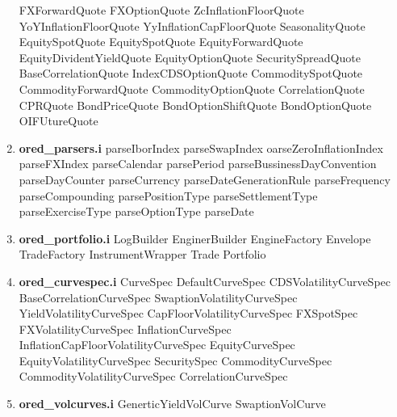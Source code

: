 \documentclass[10pt]{article}
\begin{document}
\begin{multicols}{2}
\begin{enumerate}
                \subitem FXForwardQuote
                \subitem FXOptionQuote
                \subitem ZcInflationFloorQuote
                \subitem YoYInflationFloorQuote
                \subitem YyInflationCapFloorQuote
                \subitem SeasonalityQuote
                \subitem EquitySpotQuote
                \subitem EquitySpotQuote
                \subitem EquityForwardQuote
                \subitem EquityDividentYieldQuote
                \subitem EquityOptionQuote
                \subitem SecuritySpreadQuote
                \subitem BaseCorrelationQuote
                \subitem IndexCDSOptionQuote
                \subitem CommoditySpotQuote
                \subitem CommodityForwardQuote
                \subitem CommodityOptionQuote
                \subitem CorrelationQuote
                \subitem CPRQuote
                \subitem BondPriceQuote
                \subitem BondOptionShiftQuote
                \subitem BondOptionQuote
                \subitem OIFUtureQuote
            \item \textbf{ored\_parsers.i}
                \subitem parseIborIndex
                \subitem parseSwapIndex
                \subitem oarseZeroInflationIndex
                \subitem parseFXIndex
                \subitem parseCalendar
                \subitem parsePeriod
                \subitem parseBussinessDayConvention
                \subitem parseDayCounter
                \subitem parseCurrency
                \subitem parseDateGenerationRule
                \subitem parseFrequency
                \subitem parseCompounding
                \subitem parsePositionType
                \subitem parseSettlementType
                \subitem parseExerciseType
                \subitem parseOptionType
                \subitem parseDate
             \item \textbf{ored\_portfolio.i}
                \subitem LogBuilder
                \subitem EnginerBuilder
                \subitem EngineFactory
                \subitem Envelope
                \subitem TradeFactory
                \subitem InstrumentWrapper
                \subitem Trade
                \subitem Portfolio
                \columnbreak
            \item \textbf{ored\_curvespec.i}
                \subitem CurveSpec
                \subitem DefaultCurveSpec
                \subitem CDSVolatilityCurveSpec
                \subitem BaseCorrelationCurveSpec
                \subitem SwaptionVolatilityCurveSpec
                \subitem YieldVolatilityCurveSpec
                \subitem CapFloorVolatilityCurveSpec
                \subitem FXSpotSpec
                \subitem FXVolatilityCurveSpec
                \subitem InflationCurveSpec
                \subitem InflationCapFloorVolatilityCurveSpec
                \subitem EquityCurveSpec
                \subitem EquityVolatilityCurveSpec
                \subitem SecuritySpec
                \subitem CommodityCurveSpec
                \subitem CommodityVolatilityCurveSpec
                \subitem CorrelationCurveSpec
            \item \textbf{ored\_volcurves.i}
                \subitem GenerticYieldVolCurve
                \subitem SwaptionVolCurve
                

\end{enumerate}
\end{multicols}
\end{document}

